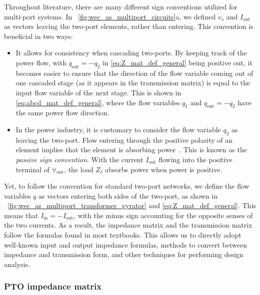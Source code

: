 \documentclass[lettersize,journal]{IEEEtran}
\begin{document}
Throughout literature, there are many different sign conventions utilized for multi-port systems. 
In \figurename~\ref{fig:wec_as_multiport_circuits}a, we defined $v_s$ and $I_{\textrm{out}}$ as vectors leaving the two-port elements, rather than entering. 
This convention is beneficial in two ways:
\begin{itemize}
         \item It allows for consistency when cascading two-ports. 
         By keeping track of the power flow, with $q_{\textrm{out}} = -q_2$ in \eqref{eq:Z_mat_def_general} being positive out, it becomes easier to ensure that the direction of the flow variable coming out of one cascaded stage (as it appears in the transmission matrix) is equal to the input flow variable of the next stage. 
         This is shown in \eqref{eq:abcd_mat_def_general}, where the flow variables $q_1$ and $q_{\textrm{out}} = -q_2$ have the same power flow direction.

         \item In the power industry, it is customary to consider the flow variable $q_2$ as leaving the two-port. 
         Flow entering through the positive polarity of an element implies that the element is absorbing power~\cite{CircuitFundamental}.
         This is known as the \textit{passive sign convention}.
         With the current $I_{\textrm{out}}$ flowing into the positive terminal of $\forall_{\textrm{out}}$, the load $Z_\ell$ absorbs power when power is positive.
\end{itemize}
Yet, to follow the convention for standard two-port networks, we define the flow variables $q$ as vectors entering both sides of the two-port, as shown in \figurename~\ref{fig:wec_as_multiport_transformer_gyrator} and \eqref{eq:Z_mat_def_general}. 
This means that $I_{\textrm{in}} = -I_{\textrm{out}}$, with the minus sign accounting for the opposite senses of the two currents. 
As a result, the impedance matrix and the transmission matrix follow the formulas found in most textbooks. 
This allows us to directly adopt well-known input and output impedance formulas, methods to convert between impedance and transmission form, and other techniques for performing design analysis.

\subsubsection{PTO impedance matrix}\label{sec:pto_impedance_matrix}
\end{document}
